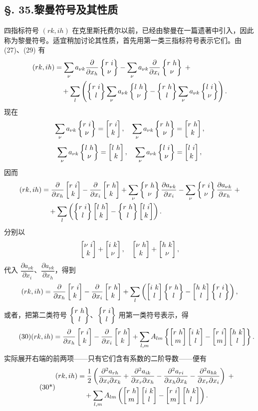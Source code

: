 \subsection*{\S. 35.\quad 黎曼符号及其性质}
四指标符号 $(rk,ih)$ 在克里斯托费尔以前，已经由黎曼在一篇遗著中引入，因此称为黎曼符号。适宜稍加讨论其性质，首先用第一类三指标符号表示它们。由 (27)、(29) 有
\[
\begin{aligned}
(rk,ih)&=\sum_\nu a_{\nu k}\frac{\partial}{\partial x_h}\chrtwo{r}{i}{\nu}
-\sum_\nu a_{\nu k}\frac{\partial}{\partial x_i}\chrtwo{r}{h}{\nu}\;+\\
&\quad+\sum_l\left(\chrtwo{r}{i}{l}\sum_\nu a_{\nu k}\chrtwo{l}{h}{\nu}-\chrtwo{r}{h}{l}\sum_\nu a_{\nu k}\chrtwo{l}{i}{\nu}\right).
\end{aligned}
\]
现在
\[
\sum_\nu a_{\nu k}\chrtwo{r}{i}{\nu}=\chrone{r}{i}{k},\quad
\sum_\nu a_{\nu k}\chrtwo{r}{h}{\nu}=\chrone{r}{h}{k},
\]
\[
\sum_\nu a_{\nu k}\chrtwo{l}{h}{\nu}=\chrone{l}{h}{k},\quad
\sum_\nu a_{\nu k}\chrtwo{l}{i}{\nu}=\chrone{l}{i}{k},
\]
因而
\[
\begin{aligned}
(rk,ih)&=\frac{\partial}{\partial x_h}\chrone{r}{i}{k}-\frac{\partial}{\partial x_i}\chrone{r}{h}{k}
+\sum_\nu\chrtwo{r}{h}{\nu}\frac{\partial a_{\nu k}}{\partial x_i}
-\sum_\nu\chrtwo{r}{i}{\nu}\frac{\partial a_{\nu k}}{\partial x_h}\;+\\
&\quad+\sum_l\left(\chrtwo{r}{i}{l}\chrone{l}{h}{k}-\chrtwo{r}{h}{l}\chrone{l}{i}{k}\right).
\end{aligned}
\]
分别以
\[
\chrone{\nu}{i}{k}+\chrone{i}{k}{\nu},\quad \chrone{\nu}{h}{k}+\chrone{h}{k}{\nu},
\]
代入 $\dfrac{\partial a_{\nu k}}{\partial x_i}$、$\dfrac{\partial a_{\nu k}}{\partial x_h}$，得到
\[
(rk,ih)=\frac{\partial}{\partial x_h}\chrone{r}{i}{k}-\frac{\partial}{\partial x_i}\chrone{r}{h}{k}
+\sum_l\left(\chrone{i}{k}{l}\chrtwo{r}{h}{l}-\chrone{h}{k}{l}\chrtwo{r}{i}{l}\right),
\]
或者，把第二类符号 $\chrtwo{r}{h}{l}$、$\chrtwo{r}{i}{l}$ 用第一类符号表示，得
\begin{equation}\tag{30}
(rk,ih)=\frac{\partial}{\partial x_h}\chrone{r}{i}{k}-\frac{\partial}{\partial x_i}\chrone{r}{h}{k}
+\sum_{l,m}A_{lm}\left\{\chrone{r}{h}{m}\chrone{i}{k}{l}-\chrone{r}{i}{m}\chrone{h}{k}{l}\right\}.
\end{equation}
实际展开右端的前两项——只有它们含有系数的二阶导数——便有
\begin{equation}\tag{30*}
\begin{aligned}
(rk,ih)&=\frac12\left(\frac{\partial^2a_{rh}}{\partial x_i\partial x_k}
+\frac{\partial^2a_{ik}}{\partial x_r\partial x_h}
-\frac{\partial^2a_{ri}}{\partial x_h\partial x_k}
-\frac{\partial^2a_{hk}}{\partial x_r\partial x_i}\right)\;+\\
&\quad+\sum_{l,m}A_{lm}\left(\chrone{r}{h}{m}\chrone{i}{k}{l}-\chrone{r}{i}{m}\chrone{h}{k}{l}\right).
\end{aligned}
\end{equation}
